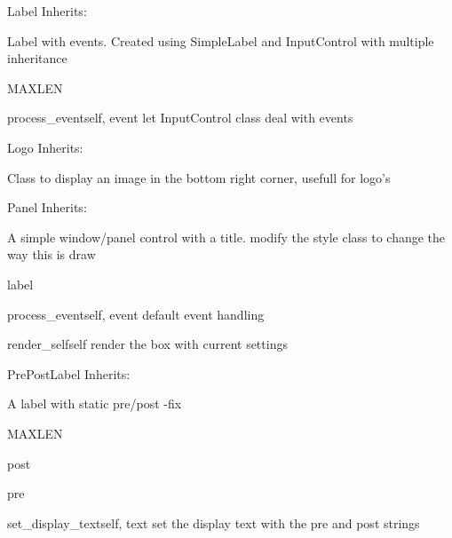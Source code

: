 \begin{classdesc*}{Label}
Inherits:

Label with events. Created using SimpleLabel and InputControl with 
multiple inheritance

\begin{datadesc}{MAXLEN}
\end{datadesc}
\begin{methoddesc}{process_event}{self, event}
let InputControl class deal with events
\end{methoddesc}

\end{classdesc*}

\begin{classdesc*}{Logo}
Inherits:

Class to display an image in the bottom right corner, usefull for logo's

\end{classdesc*}

\begin{classdesc*}{Panel}
Inherits:

A simple window/panel control with a title. modify the style
class to change the way this is draw

\begin{memberdesc}{label}

\end{memberdesc}

\begin{methoddesc}{process_event}{self, event}
default event handling
\end{methoddesc}

\begin{methoddesc}{render_self}{self}
render the box with current settings
\end{methoddesc}

\end{classdesc*}

\begin{classdesc*}{PrePostLabel}
Inherits:

A label with static pre/post -fix

\begin{datadesc}{MAXLEN}
\end{datadesc}
\begin{memberdesc}{post}

\end{memberdesc}

\begin{memberdesc}{pre}

\end{memberdesc}

\begin{methoddesc}{set_display_text}{self, text}
set the display text with the pre and post strings
\end{methoddesc}

\end{classdesc*}

